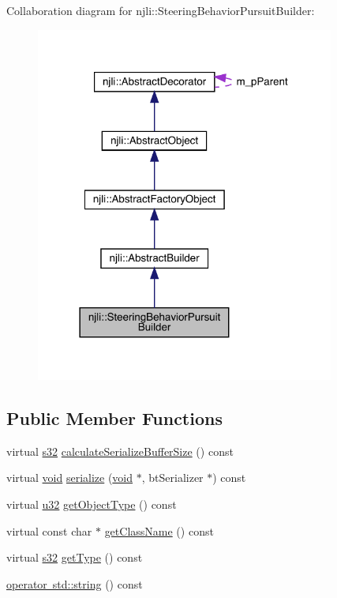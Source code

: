 Collaboration diagram for njli\+:\+:Steering\+Behavior\+Pursuit\+Builder\+:\nopagebreak
\begin{figure}[H]
\begin{center}
\leavevmode
\includegraphics[width=278pt]{classnjli_1_1_steering_behavior_pursuit_builder__coll__graph}
\end{center}
\end{figure}
\subsection*{Public Member Functions}
\begin{DoxyCompactItemize}
\item 
virtual \mbox{\hyperlink{_util_8h_aa62c75d314a0d1f37f79c4b73b2292e2}{s32}} \mbox{\hyperlink{classnjli_1_1_steering_behavior_pursuit_builder_abf877265993bd817fd6275657a66f2e9}{calculate\+Serialize\+Buffer\+Size}} () const
\item 
virtual \mbox{\hyperlink{_thread_8h_af1e856da2e658414cb2456cb6f7ebc66}{void}} \mbox{\hyperlink{classnjli_1_1_steering_behavior_pursuit_builder_a48a1fc54034465e647ca7e05c8638d8f}{serialize}} (\mbox{\hyperlink{_thread_8h_af1e856da2e658414cb2456cb6f7ebc66}{void}} $\ast$, bt\+Serializer $\ast$) const
\item 
virtual \mbox{\hyperlink{_util_8h_a10e94b422ef0c20dcdec20d31a1f5049}{u32}} \mbox{\hyperlink{classnjli_1_1_steering_behavior_pursuit_builder_a7020e317295e8b44e54ef39a3480b15d}{get\+Object\+Type}} () const
\item 
virtual const char $\ast$ \mbox{\hyperlink{classnjli_1_1_steering_behavior_pursuit_builder_ab927fa55b0237f4383347c00f61dc9e2}{get\+Class\+Name}} () const
\item 
virtual \mbox{\hyperlink{_util_8h_aa62c75d314a0d1f37f79c4b73b2292e2}{s32}} \mbox{\hyperlink{classnjli_1_1_steering_behavior_pursuit_builder_a7cce21b1009ed33ab95c8dd9b8f34451}{get\+Type}} () const
\item 
\mbox{\hyperlink{classnjli_1_1_steering_behavior_pursuit_builder_a3cae6988f26d361753f429d8a653de32}{operator std\+::string}} () const
\end{DoxyCompactItemize}

